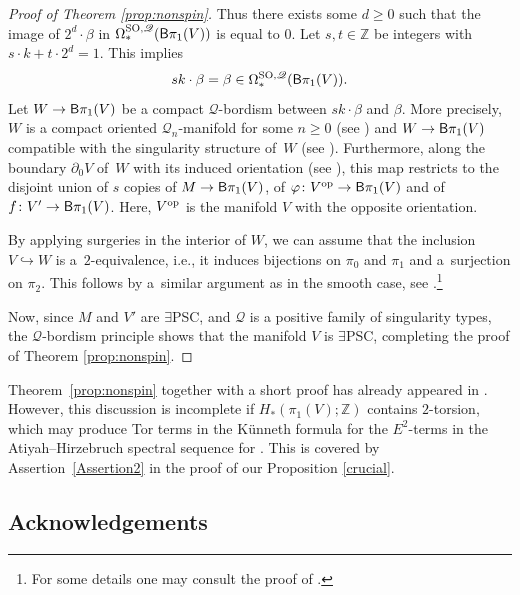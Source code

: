 \documentclass[pdftex]{sigma}
\numberwithin{equation}{section}
\newcommand{\Z}{\mathbb{Z}}
\newcommand{\SO}{\mathrm{SO}}
\newcommand{\sB}{{\sf B}}
\newcommand{\yes}{{\color {blue!70!black}$\exists$}{\sf PSC}}
\begin{document}
\begin{proof}[Proof of Theorem \ref{prop:nonspin}]
Thus there exists some $d \geq 0$ such that the image of $2^d \cdot \beta$ in $\Omega^{\SO, \mathscr{Q}}_*( \sB \pi_1(V))$ is equal to $0$.
Let $s, t \in \Z$ be integers with $s \cdot k + t \cdot 2^d = 1$.
This implies
\[
 s k \cdot \beta = \beta \in \Omega^{\SO, \mathscr{Q}}_*( \sB \pi_1(V)) .
\]
Let $W \to \sB \pi_1(V)$ be a compact $\mathscr{Q}$-bordism between $s k \cdot \beta $ and $\beta$.
More precisely, $W$ is a compact oriented $\mathscr{Q}_n$-manifold for some $n \geq 0$ (see \cite[p.\ 503]{Han20}) and $W \to \sB \pi_1(V)$ compatible with the singularity structure of~$W$ (see \cite[Definition 2.3]{Han20}).
Furthermore, along the boundary $\partial_0 V$ of~$W$ with its induced orientation (see \cite[Definition 2.1]{Han20}), this map restricts to the disjoint union of $s$ copies of $M \to \sB \pi_1(V)$, of $\varphi \colon V^{\rm op}\to \sB \pi_1(V)$ and of $f \colon V' \to \sB \pi_1(V)$.
Here, $V^{\rm op}$ is the manifold $V$ with the opposite orientation.

By applying surgeries in the interior of $W$, we can assume that the inclusion $V \hookrightarrow W$ is a~$2$-equivalence, i.e., it induces bijections on $\pi_0$ and $\pi_1$ and a~surjection on $\pi_2$.
This follows by a~similar argument as in the smooth case, see \cite[Theorem 1.5]{R-S1995}.\footnote{For some details one may consult the proof of \cite[Proposition 3.1]{SchickZenobi}.}

Now, since $M$ and $V'$ are \yes, and $\mathscr{Q}$ is a positive family of singularity types, the $\mathscr{Q}$-bordism principle \cite[Proposition 3.11]{Han20} shows that the manifold $V$ is \yes, completing the proof of Theorem \ref{prop:nonspin}.
\end{proof}

\begin{Remark} Theorem~\ref{prop:nonspin} together with a short proof has already appeared in \cite[Theorem~4.11]{RS}.
However, this discussion is incomplete if $H_*(\pi_1(V); \Z)$ contains $2$-torsion, which may produce Tor terms in the K\"unneth formula for the $E^2$-terms \smash{$H_p\big( \sB \pi_1(V) ; \Omega^{\SO}_q\big)_{(2)}$} in the Atiyah--Hirzebruch spectral sequence for \smash{$\Omega^{\SO}_*( \sB \pi_1(V))_{(2)}$}.
This is covered by Assertion~\ref{Assertion2} in the proof of our Proposition \ref{crucial}.
\end{Remark}

\subsection*{Acknowledgements}
\end{document}
